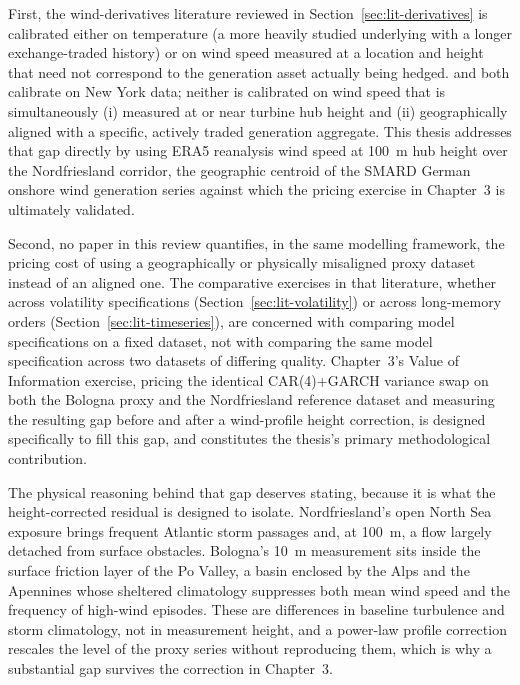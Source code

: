 \documentclass[11pt, a4paper, twoside]{article}
\begin{document}
First, the wind-derivatives literature reviewed in Section~\ref{sec:lit-derivatives} is calibrated either on temperature (a more heavily studied underlying with a longer exchange-traded history) or on wind speed measured at a location and height that need not correspond to the generation asset actually being hedged. \citet{BenthSaltyteBenth2009} and \citet{AlexandridisZapranis2013} both calibrate on New York data; neither is calibrated on wind speed that is simultaneously (i) measured at or near turbine hub height and (ii) geographically aligned with a specific, actively traded generation aggregate. This thesis addresses that gap directly by using ERA5 reanalysis wind speed at 100~m hub height over the Nordfriesland corridor, the geographic centroid of the SMARD German onshore wind generation series against which the pricing exercise in Chapter~3 is ultimately validated.

Second, no paper in this review quantifies, in the same modelling framework, the pricing cost of using a geographically or physically misaligned proxy dataset instead of an aligned one. The comparative exercises in that literature, whether across volatility specifications (Section~\ref{sec:lit-volatility}) or across long-memory orders (Section~\ref{sec:lit-timeseries}), are concerned with comparing model specifications on a fixed dataset, not with comparing the same model specification across two datasets of differing quality. Chapter~3's Value of Information exercise, pricing the identical CAR(4)+GARCH variance swap on both the Bologna proxy and the Nordfriesland reference dataset and measuring the resulting gap before and after a wind-profile height correction, is designed specifically to fill this gap, and constitutes the thesis's primary methodological contribution.

The physical reasoning behind that gap deserves stating, because it is what the height-corrected residual is designed to isolate. Nordfriesland's open North Sea exposure brings frequent Atlantic storm passages and, at 100~m, a flow largely detached from surface obstacles. Bologna's 10~m measurement sits inside the surface friction layer of the Po Valley, a basin enclosed by the Alps and the Apennines whose sheltered climatology suppresses both mean wind speed and the frequency of high-wind episodes. These are differences in baseline turbulence and storm climatology, not in measurement height, and a power-law profile correction rescales the level of the proxy series without reproducing them, which is why a substantial gap survives the correction in Chapter~3.
\end{document}
